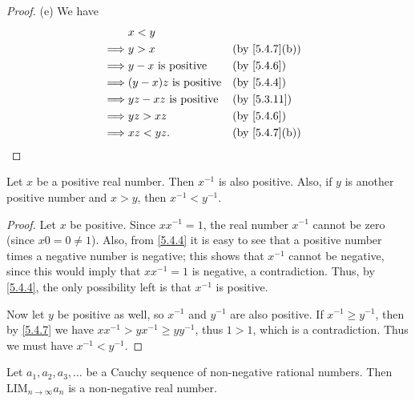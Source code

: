 \begin{proof}{(e)}
  We have
  \begin{align*}
             & x < y                                                         \\
    \implies & y > x                        &  & \text{(by \cref{5.4.7}(b))} \\
    \implies & y - x \text{ is positive}    &  & \by{5.4.6}                  \\
    \implies & (y - x)z \text{ is positive} &  & \by{5.4.4}                  \\
    \implies & yz - xz \text{ is positive}  &  & \text{(by \cref{5.3.11})}   \\
    \implies & yz > xz                      &  & \by{5.4.6}                  \\
    \implies & xz < yz.                     &  & \text{(by \cref{5.4.7}(b))}
  \end{align*}
\end{proof}

\begin{prop}\label{5.4.8}
  Let \(x\) be a positive real number.
  Then \(x^{-1}\) is also positive.
  Also, if \(y\) is another positive number and \(x > y\), then \(x^{-1} < y^{-1}\).
\end{prop}

\begin{proof}
  Let \(x\) be positive.
  Since \(xx^{-1} = 1\), the real number \(x^{-1}\) cannot be zero (since \(x0 = 0 \neq 1\)).
  Also, from \cref{5.4.4} it is easy to see that a positive number times a negative number is negative;
  this shows that \(x^{-1}\) cannot be negative, since this would imply that \(xx^{-1} = 1\) is negative, a contradiction.
  Thus, by \cref{5.4.4}, the only possibility left is that \(x^{-1}\) is positive.

  Now let \(y\) be positive as well, so \(x^{-1}\) and \(y^{-1}\) are also positive.
  If \(x^{-1} \geq y^{-1}\), then by \cref{5.4.7} we have \(xx^{-1} > yx^{-1} \geq yy^{-1}\), thus \(1 > 1\), which is a contradiction.
  Thus we must have \(x^{-1} < y^{-1}\).
\end{proof}

\begin{prop}\label{5.4.9}
  Let \(a_1, a_2, a_3, \dots\) be a Cauchy sequence of non-negative rational numbers.
  Then \(\text{LIM}_{n \to \infty} a_n\) is a non-negative real number.
\end{prop}

